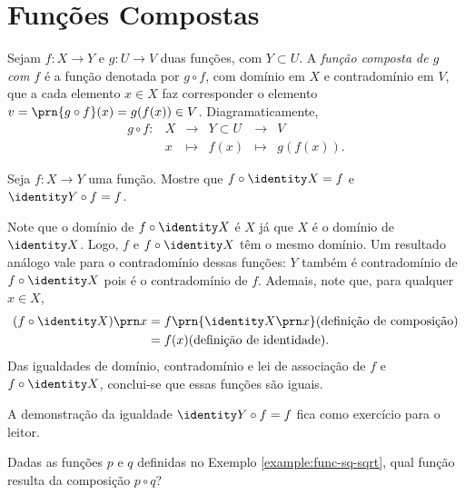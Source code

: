 \section{Funções Compostas}

\begin{definition}
Sejam $f: X \to Y$ e $g: U \to V$ duas funções, com $Y \subset U$. A \emph{função composta de $g$ com $f$} é a função denotada por $g \circ f$, com domínio em $X$ e contradomínio em $V$, que a cada elemento $x \in X$ faz corresponder o elemento $v = \prn{g \circ f}(x) = g(f(x)) \in V$. Diagramaticamente,
%
\begin{equation*}
\begin{array}{cccccc}
g \circ f : & X & \to     & Y \subset U & \to & V \\
	&  x & \mapsto & f(x) & \mapsto & g(f(x)).
\end{array}
\end{equation*}
\end{definition}

\begin{center}
\end{center}

\begin{example}
Seja $f: X \to Y$ uma função. Mostre que $f \circ \identity X = f$ e $\identity Y \circ f = f$.
\end{example}

\begin{solution}
Note que o domínio de $f \circ \identity X$ é $X$ já que $X$ é o domínio de $\identity X$. Logo, $f$ e $f \circ \identity X$ têm o mesmo domínio.
Um resultado análogo vale para o contradomínio dessas funções:  $Y$ também é contradomínio de $f \circ \identity X$ pois é o contradomínio de $f$.
Ademais, note que, para qualquer $x \in X$, 
%
\begin{align*}
(f \circ \identity X)\prn x &= f\prn{\identity X \prn x} \text{(definição de composição)} \\ &= f(x) \text{(definição de identidade)}.
\end{align*}
% 
Das igualdades de domínio, contradomínio e lei de associação de $f$ e $f \circ \identity X$, conclui-se que essas funções são iguais.

A demonstração da igualdade $\identity Y \circ f = f$ fica como exercício para o leitor.
\end{solution}

\begin{example}
\label{ex:comp-pq}
Dadas as funções $p$ e $q$ definidas no Exemplo \ref{example:func-sq-sqrt}, qual função resulta da composição $p \circ q$?
\end{example}

